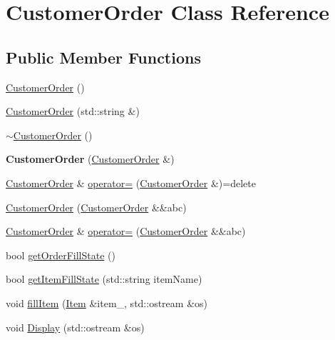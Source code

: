 \hypertarget{class_customer_order}{}\section{Customer\+Order Class Reference}
\label{class_customer_order}
\subsection*{Public Member Functions}
\begin{DoxyCompactItemize}
\item 
\mbox{\hyperlink{class_customer_order_acbab5cc6c05427a4f4fbba49c3b74f46}{Customer\+Order}} ()
\item 
\mbox{\hyperlink{class_customer_order_a00e1cb818605bcd7457febba4ca9e166}{Customer\+Order}} (std\+::string \&)
\item 
\mbox{\hyperlink{class_customer_order_ae36af98287386c97b66537ac463b09c6}{$\sim$\+Customer\+Order}} ()
\item 
\mbox{\label{class_customer_order_a88603e0493f6bf116b6301be6f36b152}} 
{\bfseries Customer\+Order} (\mbox{\hyperlink{class_customer_order}{Customer\+Order}} \&)
\item 
\mbox{\hyperlink{class_customer_order}{Customer\+Order}} \& \mbox{\hyperlink{class_customer_order_a1a83b197a0ca27da950b7321273c46a5}{operator=}} (\mbox{\hyperlink{class_customer_order}{Customer\+Order}} \&)=delete
\item 
\mbox{\hyperlink{class_customer_order_a5cc0eb676893d18cdbd810915d40580d}{Customer\+Order}} (\mbox{\hyperlink{class_customer_order}{Customer\+Order}} \&\&abc)
\item 
\mbox{\hyperlink{class_customer_order}{Customer\+Order}} \& \mbox{\hyperlink{class_customer_order_a87630720d86454abf4b6c66983415e76}{operator=}} (\mbox{\hyperlink{class_customer_order}{Customer\+Order}} \&\&abc)
\item 
bool \mbox{\hyperlink{class_customer_order_a36aede6a3339abdd2f476119dea55cf4}{get\+Order\+Fill\+State}} ()
\item 
bool \mbox{\hyperlink{class_customer_order_acf9c99fcd0b8899c75626c00ad207083}{get\+Item\+Fill\+State}} (std\+::string item\+Name)
\item 
void \mbox{\hyperlink{class_customer_order_adf12105edd7446b9ea89f89db271e5d9}{fill\+Item}} (\mbox{\hyperlink{class_item}{Item}} \&item\+\_\+, std\+::ostream \&os)
\item 
void \mbox{\hyperlink{class_customer_order_a33b5c9caa32e0100d459ddf4e453e14b}{Display}} (std\+::ostream \&os)
\end{DoxyCompactItemize}


